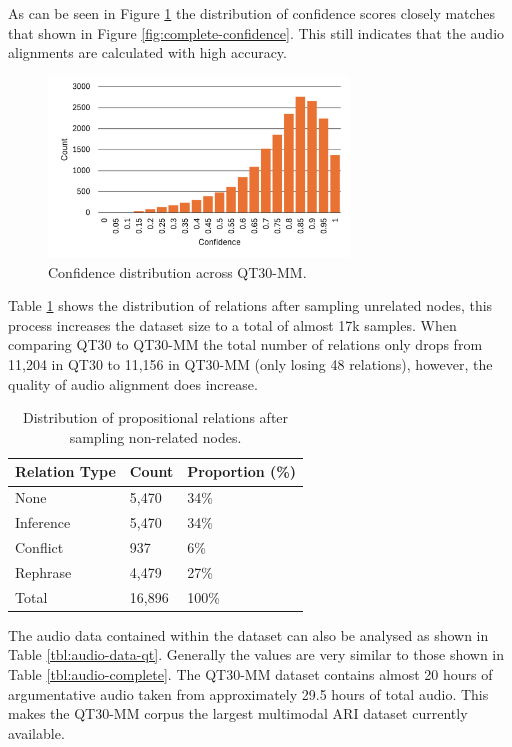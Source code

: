 \documentclass[twocolumn]{article}
\begin{document}
As can be seen in Figure \ref{fig:qt30-mm-confidence} the distribution
of confidence scores closely matches that shown in Figure
\ref{fig:complete-confidence}. This still indicates that the audio
alignments are calculated with high accuracy.

\begin{figure}[h]
\centering
\includegraphics[width=8cm]{qt30-mm-confidence}
\caption{Confidence distribution across QT30-MM. \label{fig:qt30-mm-confidence}}
\end{figure}

Table \ref{tbl:qt-mm-rel-no} shows the distribution of relations after
sampling unrelated nodes, this process increases the dataset size to a
total of almost 17k samples. When comparing QT30 to QT30-MM the total
number of relations only drops from 11,204 in QT30 to 11,156 in QT30-MM
(only losing 48 relations), however, the quality of audio alignment does
increase.

\begin{table}[h]
\centering
\caption{Distribution of propositional relations after sampling non-related nodes. \label{tbl:qt-mm-rel-no}}
\begin{tabular}{|l|ll|}
\hline
Relation Type & Count  & Proportion (\%) \\ \hline
None          & 5,470  & 34\%            \\
Inference     & 5,470  & 34\%            \\
Conflict      & 937    & 6\%             \\
Rephrase      & 4,479  & 27\%            \\ \hline
Total         & 16,896 & 100\%           \\ \hline
\end{tabular}
\end{table}

The audio data contained within the dataset can also be analysed as
shown in Table \ref{tbl:audio-data-qt}. Generally the values are very
similar to those shown in Table \ref{tbl:audio-complete}. The QT30-MM
dataset contains almost 20 hours of argumentative audio taken from
approximately 29.5 hours of total audio. This makes the QT30-MM corpus
the largest multimodal ARI dataset currently available.
\end{document}
